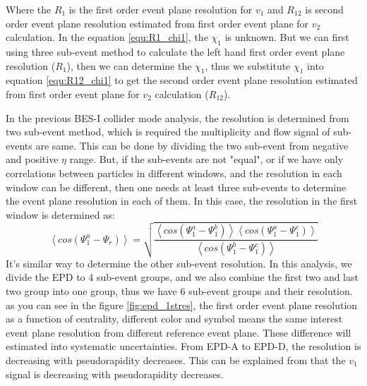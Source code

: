 Where the $R_{1}$ is the first order event plane resolution for $v_{1}$ and $R_{12}$ is second order event plane resolution estimated from first order event plane for $v_{2}$ calculation. In the equation \ref{equ:R1_chi1}, the $\chi_{1}$ is unknown. But we can first using three sub-event method to calculate the left hand first order event plane resolution ($R_{1}$), then we can determine the $\chi_{1}$, thus we substitute $\chi_{1}$ into equation \ref{equ:R12_chi1} to get the second order event plane resolution estimated from first order event plane for $v_{2}$ calculation ($R_{12}$). 

In the previous BES-I collider mode analysis, the resolution is determined from two sub-event method, which is required the multiplicity and flow signal of sub-events are same. This can be done by dividing the two sub-event from negative and positive $\eta$ range. But, if the sub-events are not "equal", or if we have only correlations between particles in different windows, and the resolution in each window can be different, then one needs at least three sub-events to determine the event plane resolution in each of them. In this case, the resolution in the first window is determined as:
\begin{equation}
	\left< cos(\Psi_{1}^{a}-\Psi_{r}) \right> = 
	\sqrt{\frac{\left< cos(\Psi_{1}^{a}-\Psi_{1}^{b}) \right>\left< cos(\Psi_{1}^{a}-\Psi_{1}^{c}) \right>}
	{\left< cos(\Psi_{1}^{b}-\Psi_{1}^{c}) \right>}}
\end{equation}
It's similar way to determine the other sub-event resolution. In this analysis, we divide the EPD to 4 sub-event groups, and we also combine the first two and last two group into one group, thus we have 6 sub-event groups and their resolution. as you can see in the figure \ref{fig:epd_1stres}, the first order event plane resolution as a function of centrality, different color and symbol means the same interest event plane resolution from different reference event plane. These difference will estimated into systematic uncertainties. From EPD-A to EPD-D, the resolution is decreasing with pseudorapidity decreases. This can be explained from that the $v_{1}$ signal is decreasing with pseudorapidity decreases.


